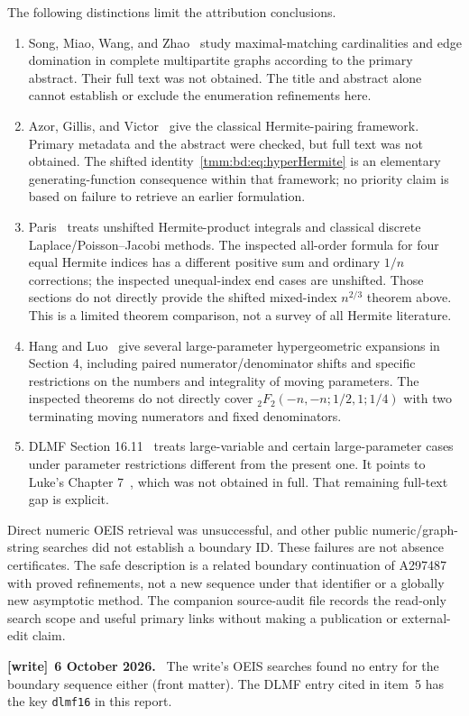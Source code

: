 \documentclass[11pt,letterpaper]{article}
\theoremstyle{remark}\newtheorem{remark}[theorem]{Remark}
\newenvironment{writenote}[1][]{\par\smallskip\begingroup\small
 \noindent\textbf{[write]}\if\relax\detokenize{#1}\relax\else~\textbf{#1.}\fi\ }%
 {\par\endgroup\smallskip}
\begin{document}
The following distinctions limit the attribution conclusions.
\begin{enumerate}
\item Song, Miao, Wang, and Zhao~\cite{song} study maximal-matching cardinalities and edge domination in complete multipartite graphs according to the primary abstract. Their full text was not obtained. The title and abstract alone cannot establish or exclude the enumeration refinements here.
\item Azor, Gillis, and Victor~\cite{azor} give the classical Hermite-pairing framework. Primary metadata and the abstract were checked, but full text was not obtained. The shifted identity~\eqref{tmm:bd:eq:hyperHermite} is an elementary generating-function consequence within that framework; no priority claim is based on failure to retrieve an earlier formulation.
\item Paris~\cite{paris} treats unshifted Hermite-product integrals and classical discrete Laplace/Poisson--Jacobi methods. The inspected all-order formula for four equal Hermite indices has a different positive sum and ordinary $1/n$ corrections; the inspected unequal-index end cases are unshifted. Those sections do not directly provide the shifted mixed-index $n^{2/3}$ theorem above. This is a limited theorem comparison, not a survey of all Hermite literature.
\item Hang and Luo~\cite{hang} give several large-parameter hypergeometric expansions in Section 4, including paired numerator/denominator shifts and specific restrictions on the numbers and integrality of moving parameters. The inspected theorems do not directly cover ${}_2F_2(-n,-n;1/2,1;1/4)$ with two terminating moving numerators and fixed denominators.
\item DLMF Section 16.11~\cite{dlmf16} treats large-variable and certain large-parameter cases under parameter restrictions different from the present one. It points to Luke's Chapter 7~\cite{luke}, which was not obtained in full. That remaining full-text gap is explicit.
\end{enumerate}
Direct numeric OEIS retrieval was unsuccessful, and other public numeric/graph-string searches did not establish a boundary ID. These failures are not absence certificates. The safe description is a related boundary continuation of A297487 with proved refinements, not a new sequence under that identifier or a globally new asymptotic method. The companion source-audit file records the read-only search scope and useful primary links without making a publication or external-edit claim.
\begin{writenote}[6 October 2026]
The write's OEIS searches found no entry for the boundary sequence either (front matter). The DLMF entry cited in item~5 has the key \texttt{dlmf16} in this report.
\end{writenote}
\end{document}

